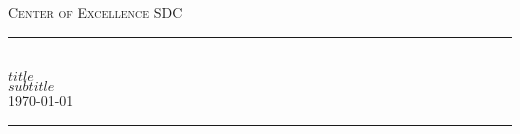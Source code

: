 %
%
%
% 


	\newcommand{\HRule}{\rule{\linewidth}{0.5mm}} %
	
	\center %
	
	
	\textsc{\LARGE Center of Excellence SDC}\\[1.5cm] %
	
	
	
	
	\HRule\\[0.4cm]
	
	{\huge\bfseries{} $title$}\\[0.4cm] %
	{\large\bfseries{} $subtitle$}\\[0.4cm]
	{\large\monthyeardate\today}\\[0.4cm] %

	\HRule\\[1.5cm]
	
	
